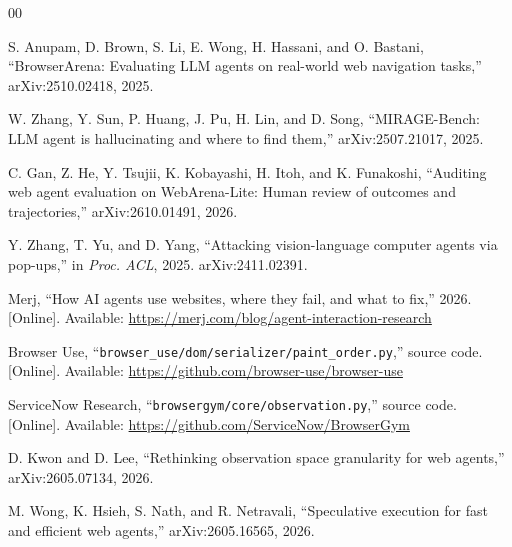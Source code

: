 \documentclass[conference]{IEEEtran}
\begin{document}
\begin{thebibliography}{00}

S. Anupam, D. Brown, S. Li, E. Wong, H. Hassani, and O. Bastani,
``BrowserArena: Evaluating LLM agents on real-world web navigation tasks,''
arXiv:2510.02418, 2025.

W. Zhang, Y. Sun, P. Huang, J. Pu, H. Lin, and D. Song,
``MIRAGE-Bench: LLM agent is hallucinating and where to find them,''
arXiv:2507.21017, 2025.

C. Gan, Z. He, Y. Tsujii, K. Kobayashi, H. Itoh, and K. Funakoshi,
``Auditing web agent evaluation on WebArena-Lite: Human review of outcomes and
trajectories,'' arXiv:2610.01491, 2026.

Y. Zhang, T. Yu, and D. Yang, ``Attacking vision-language computer agents via
pop-ups,'' in \emph{Proc. ACL}, 2025. arXiv:2411.02391.

Merj, ``How AI agents use websites, where they fail, and what to fix,''
2026. [Online]. Available: \url{https://merj.com/blog/agent-interaction-research}

Browser Use, ``\texttt{browser\_use/dom/serializer/paint\_order.py},''
source code. [Online]. Available: \url{https://github.com/browser-use/browser-use}

ServiceNow Research, ``\texttt{browsergym/core/observation.py},'' source code.
[Online]. Available: \url{https://github.com/ServiceNow/BrowserGym}

D. Kwon and D. Lee, ``Rethinking observation space granularity for web
agents,'' arXiv:2605.07134, 2026.

M. Wong, K. Hsieh, S. Nath, and R. Netravali, ``Speculative execution for fast
and efficient web agents,'' arXiv:2605.16565, 2026.

\end{thebibliography}
\end{document}
